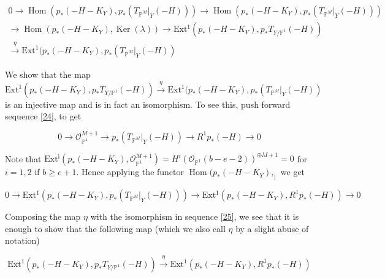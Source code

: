 \documentclass[11pt,twoside]{amsart}
\theoremstyle{plain}
\numberwithin{equation}{section}
\theoremstyle{definition}
\begin{document}
\begin{multline}\label{30}
0 \to \operatorname{Hom}(p_*(-H-K_Y), 
 p_*(T_{\mathbb{P}^M}|_Y(-H)))  \to \operatorname{Hom}(p_*(-H-K_Y), p_*(T_{\mathbb{P}^M}|_Y(-H))) \\ \to \operatorname{Hom}(p_*(-H-K_Y),\operatorname{Ker}(\lambda)) \to \operatorname{Ext^1}(p_*(-H-K_Y), 
 p_*T_{Y/\mathbb{P}^1}(-H)) \\ \xrightarrow[]{\eta} \operatorname{Ext^1}(p_*(-H-K_Y), 
 p_*(T_{\mathbb{P}^M}|_Y(-H))
\end{multline}


We show that the map $\operatorname{Ext^1}(p_*(-H-K_Y), 
 p_*T_{Y/\mathbb{P}^1}(-H))  \xrightarrow[]{\eta} \operatorname{Ext^1}(p_*(-H-K_Y), 
 p_*(T_{\mathbb{P}^M}|_Y(-H))$ is an injective map and is in fact an isomorphism. To see this, push forward sequence \ref{24}, to get 

 \begin{equation}\label{25}
     0 \to \mathcal{O}_{\mathbb{P}^1}^{M+1} \to p_*(T_{\mathbb{P}^M}|_Y(-H)) \to R^1p_*(-H) \to 0
 \end{equation}

Note that $\operatorname{Ext^i}(p_*(-H-K_Y), \mathcal{O}_{\mathbb{P}^1}^{M+1}) = H^i(\mathcal{O}_{\mathbb{P}^1}(b-e-2))^{\oplus M+1} = 0$ for $i = 1,2$ if $b \geq e+1$. Hence applying the functor $\operatorname{Hom}(p_*(-H-K_Y), _)$ we get 

\begin{equation}\label{26}
     0 \to \operatorname{Ext^1}(p_*(-H-K_Y), 
 p_*(T_{\mathbb{P}^M}|_Y(-H))) \to \operatorname{Ext^1}(p_*(-H-K_Y), 
 R^1p_*(-H)) \to 0
 \end{equation}

Composing the map $\eta$ with the isomorphism in sequence \ref{25}, we see that it is enough to show that the following map (which we also call $\eta$ by a slight abuse of notation)

\begin{equation}\label{27}
   \operatorname{Ext^1}(p_*(-H-K_Y), 
 p_*T_{Y/\mathbb{P}^1}(-H))  \xrightarrow[]{\eta} \operatorname{Ext^1}(p_*(-H-K_Y), 
 R^1p_*(-H)) 
\end{equation}
\end{document}
